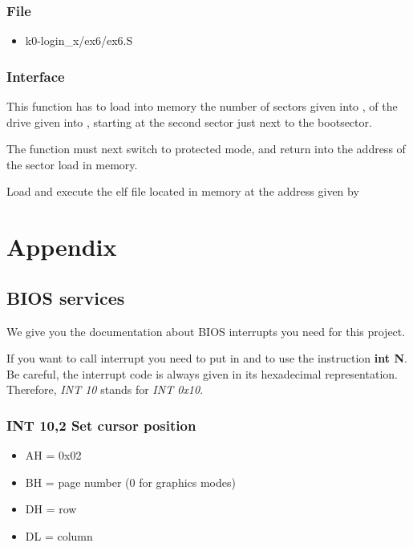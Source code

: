 \subsection*{File}
\begin{itemize}
  \item k0-login\_x/ex6/ex6.S
\end{itemize}

\subsection*{Interface}

{
  This function has to load into memory the number of sectors given into
  , of the drive given into , starting at
  the second sector just next to the bootsector.

  The function must next switch to protected mode, and return into
   the address of the sector load in memory.
}

{
  Load and execute the elf file located in memory at the address given by 
}

%
%

\chapter{Appendix}

%
%

\section{BIOS services}

We give you the documentation about BIOS interrupts you need for this
project.

If you want to call interrupt  you need to put  in
 and to use the instruction \textbf{int N}. Be careful, the
interrupt code is always given in its hexadecimal representation. Therefore,
\emph{INT 10} stands for \emph{INT 0x10}.

%
%
\subsection{INT 10,2 Set cursor position}
\begin{itemize}
  \item
    AH = 0x02
  \item
    BH = page number (0 for graphics modes)
  \item
    DH = row
  \item
    DL = column
\end{itemize}

